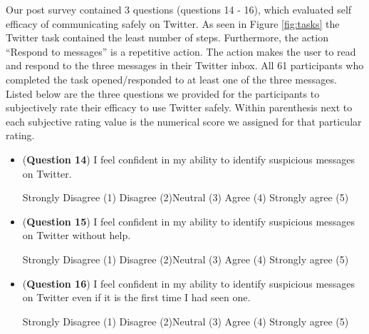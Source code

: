 Our post survey contained 3 questions (questions 14 - 16), which evaluated self efficacy of communicating safely on Twitter. 
As seen in Figure \ref{fig:tasks} the Twitter task contained the least number of steps. Furthermore, the action ``Respond to messages'' is a repetitive action. The action makes the user to read and respond to the three messages in their Twitter inbox. All 61 participants who completed the task opened/responded to at least one of the three messages.
Listed below are the three questions we provided for the participants to  subjectively rate their efficacy to use Twitter safely.
Within parenthesis next to each subjective rating value is the numerical score we assigned for that particular rating.
\begin{itemize}
\item (\textbf{Question 14}) I feel confident in my ability to identify suspicious messages on Twitter.
\par Strongly Disagree (1) \hspace{0.5cm} Disagree (2)\hspace{0.5cm}Neutral (3)\hspace{0.5cm} Agree (4)\hspace{0.5cm} Strongly agree (5)
\item (\textbf{Question 15}) I feel confident in my ability to identify suspicious messages on Twitter without help.
\par Strongly Disagree (1) \hspace{0.5cm} Disagree (2)\hspace{0.5cm}Neutral (3)\hspace{0.5cm} Agree (4)\hspace{0.5cm} Strongly agree (5)
\item (\textbf{Question 16}) I feel confident in my ability to identify suspicious messages on Twitter even if it is the first time I had seen one.
\par Strongly Disagree (1) \hspace{0.5cm} Disagree (2)\hspace{0.5cm}Neutral (3)\hspace{0.5cm} Agree (4)\hspace{0.5cm} Strongly agree (5)
\end{itemize}
